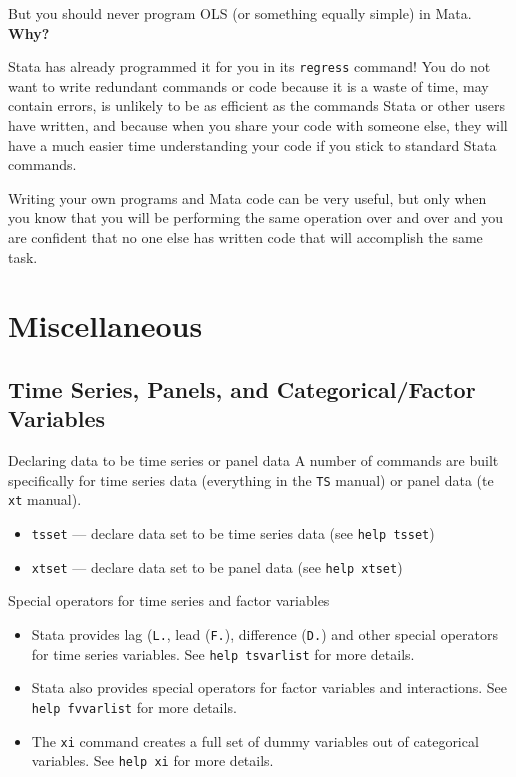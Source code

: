 \documentclass[fleqn, handout, 10pt]{beamer}
\def\lst{\lstinline}
\begin{document}
\begin{frame}
    But you should never program OLS (or something equally simple) in Mata. \textbf{Why?} \pause

    Stata has already programmed it for you in its \lst=regress= command! You do not want to write redundant commands or code because it is a waste of time, may contain errors, is unlikely to be as efficient as the commands Stata or other users have written, and because when you share your code with someone else, they will have a much easier time understanding your code if you stick to standard Stata commands.

    Writing your own programs and Mata code can be very useful, but only when you know that you will be performing the same operation over and over and you are confident that no one else has written code that will accomplish the same task.
\end{frame}

\section{Miscellaneous}

\subsection{Time Series, Panels, and Categorical/Factor Variables}

\begin{frame}[fragile]{Declaring data to be time series or panel data}
    A number of commands are built specifically for time series data (everything in the \lst=TS= manual) or panel data (te \lst=xt= manual).
    \begin{itemize}
        \item \lst=tsset= --- declare data set to be time series data (see \lst=help tsset=)
        \item \lst=xtset= --- declare data set to be panel data (see \lst=help xtset=)
    \end{itemize}
\end{frame}


\begin{frame}[fragile]{Special operators for time series and factor variables}
    \begin{itemize}
        \item Stata provides lag (\lst=L.=, lead (\lst=F.=), difference (\lst=D.=) and other special operators for time series variables. See \lst=help tsvarlist= for more details.
        \item Stata also provides special operators for factor variables and interactions. See \lst=help fvvarlist= for more details.
        \item The \lst=xi= command creates a full set of dummy variables out of categorical variables. See \lst=help xi= for more details.
    \end{itemize}
\end{frame}
\end{document}
